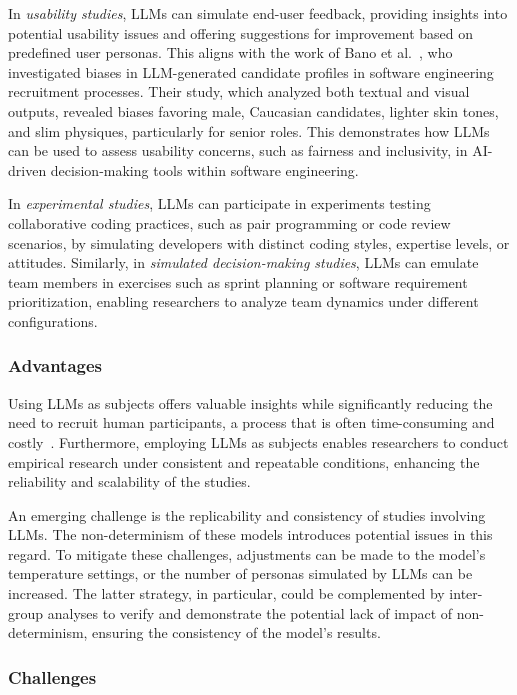 \documentclass[11pt]{article}
\begin{document}
In \textit{usability studies}, LLMs can simulate end-user feedback, providing insights into potential usability issues and offering suggestions for improvement based on predefined user personas. This aligns with the work of Bano et al.~\cite{bano2025doessoftwareengineerlook}, who investigated biases in LLM-generated candidate profiles in software engineering recruitment processes. Their study, which analyzed both textual and visual outputs, revealed biases favoring male, Caucasian candidates, lighter skin tones, and slim physiques, particularly for senior roles. This demonstrates how LLMs can be used to assess usability concerns, such as fairness and inclusivity, in AI-driven decision-making tools within software engineering.

In \textit{experimental studies}, LLMs can participate in experiments testing collaborative coding practices, such as pair programming or code review scenarios, by simulating developers with distinct coding styles, expertise levels, or attitudes. 
Similarly, in \textit{simulated decision-making studies}, LLMs can emulate team members in exercises such as sprint planning or software requirement prioritization, enabling researchers to analyze team dynamics under different configurations.

\subsubsection{Advantages}

Using LLMs as subjects offers valuable insights while significantly reducing the need to recruit human participants, a process that is often time-consuming and costly~\cite{DBLP:conf/vl/Madampe0HO24}. 
Furthermore, employing LLMs as subjects enables researchers to conduct empirical research under consistent and repeatable conditions, enhancing the reliability and scalability of the studies.

An emerging challenge is the replicability and consistency of studies involving LLMs. The non-determinism of these models introduces potential issues in this regard. To mitigate these challenges, adjustments can be made to the model's temperature settings, or the number of personas simulated by LLMs can be increased. The latter strategy, in particular, could be complemented by inter-group analyses to verify and demonstrate the potential lack of impact of non-determinism, ensuring the consistency of the model's results.

\subsubsection{Challenges}
\end{document}
